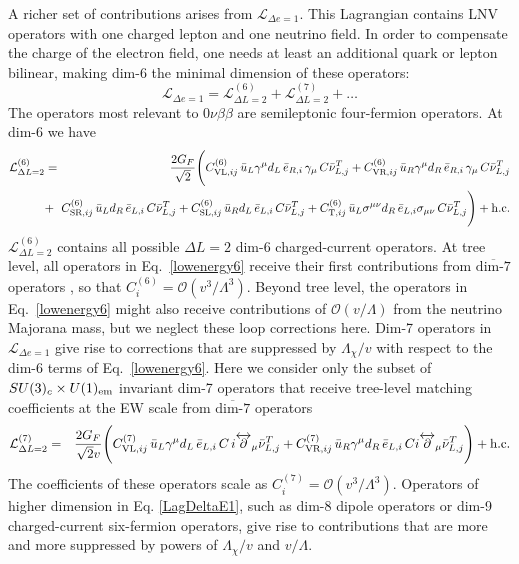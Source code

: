 \documentclass[letterpaper,11pt]{article}
\newcommand{\bea}{\begin{eqnarray}}
\newcommand{\eea}{\end{eqnarray}}
\newcommand{\nn}{\nonumber}
\newcommand{\textoverline}[1]{$\overline{\mbox{#1}}$}
\begin{document}
A richer set of contributions
arises from $\mathcal L_{\Delta e = 1}$.  This Lagrangian contains  LNV operators with one charged lepton and one neutrino field.
In order to compensate the charge of the electron field, one needs at least an additional quark or lepton bilinear, making dim-6 the minimal dimension of these operators:
\begin{equation}\label{LagDeltaE1}
\mathcal L_{\Delta e = 1} = \mathcal L^{(6)}_{\Delta L = 2} + \mathcal L^{(7)}_{\Delta L = 2} + \ldots
\end{equation}
The operators most relevant to $0\nu\beta\beta$ are semileptonic four-fermion operators. At dim-6 we have  
\bea
\mathcal L^{(6)}_{\Delta L = 2}& =& \frac{2 G_F}{\sqrt{2}} \Bigg(
C^{(6)}_{\textrm{VL},ij} \,  \bar u_L \gamma^\mu d_L \, \bar e_{R,i} \,  \gamma_\mu \, C\bar \nu^T_{L,j} + 
C^{(6)}_{\textrm{VR},ij} \,  \bar u_R \gamma^\mu d_R \, \bar e_{R,i}\,  \gamma_\mu  \,C\bar\nu_{L,j}^T \label{lowenergy6}   \\
&  +& \!\!\!\!
C^{(6)}_{ \textrm{SR},ij} \,  \bar u_L  d_R \, \bar e_{L,i}\, C  \bar \nu^T_{L,j} + 
C^{(6)}_{ \textrm{SL},ij} \,  \bar u_R  d_L \, \bar e_{L,i} \, C  \bar\nu_{L,j}^T + 
C^{(6)}_{ \textrm{T},ij} \,  \bar u_L \sigma^{\mu\nu} d_R \, \bar e_{L,i}  \sigma_{\mu\nu}  \, C\bar\nu_{L,j}^T
\Bigg)  +{\rm h.c.}\nn
\eea
$\mathcal L^{(6)}_{\Delta L=2}$ contains all possible $\Delta L = 2$ dim-6 charged-current operators. At tree level, all operators in Eq.\ \eqref{lowenergy6} receive their first contributions from \textoverline{dim-7} operators \cite{Cirigliano:2017djv}, so that $C^{(6)}_i = \mathcal O(v^3/\Lambda^3)$. Beyond tree level, the operators in Eq.\ \eqref{lowenergy6} might also receive contributions of $\mathcal O(v/\Lambda)$ from the neutrino Majorana mass, but we neglect these loop corrections here.
Dim-7 operators in $\mathcal L_{\Delta e = 1}$ give rise to corrections that are suppressed by $\Lambda_\chi/v$ with respect to the dim-6 terms of  Eq.\ \eqref{lowenergy6}.
Here we consider only  the  subset of  $SU(3)_c\times U(1)_{\rm em}$ invariant dim-7 operators that receive tree-level matching coefficients at the EW scale from \textoverline{dim-7} operators \cite{Cirigliano:2017djv}
\bea
\mathcal L^{(7)}_{\Delta L = 2} &=& \frac{2 G_F}{\sqrt{2} v} \Bigg( 
C^{(7)}_{\textrm{VL},ij} \,  \bar u_L \gamma^\mu d_L \, \bar e_{L,i} \, C \,  i \overleftrightarrow{\partial}_\mu \bar \nu_{L,j}^T  +
C^{(7)}_{\textrm{VR},ij} \,  \bar u_R \gamma^\mu d_R \, \bar e_{L,i} \, C i \overleftrightarrow{\partial}_\mu \bar \nu^T_{L,j}  \Bigg)  +{\rm h.c.}\label{lowenergy7}
\eea
The coefficients of these operators  scale as $C^{(7)}_i = \mathcal O(v^3/\Lambda^3)$.  
Operators of higher dimension in Eq. \eqref{LagDeltaE1}, such as dim-8 dipole operators or dim-9 charged-current six-fermion operators, give rise to contributions that are more and more suppressed by powers of $\Lambda_
\chi/v$ and $v/\Lambda$.
\end{document}
